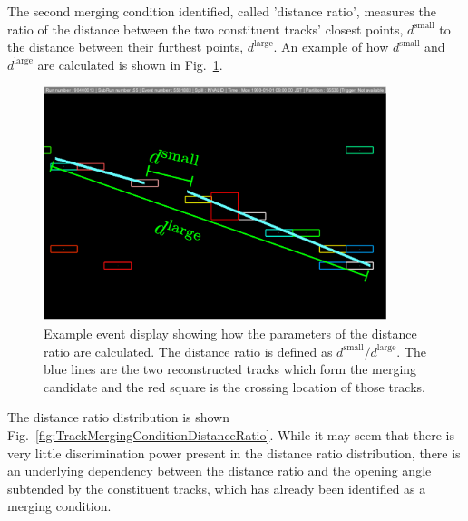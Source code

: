 \newline
\newline
The second merging condition identified, called 'distance ratio', measures the ratio of the distance between the two constituent tracks' closest points, $d^{\textrm{small}}$ to the distance between their furthest points, $d^{\textrm{large}}$.  An example of how $d^{\textrm{small}}$ and $d^{\textrm{large}}$ are calculated is shown in Fig.~\ref{fig:DistanceRatioEventDisplay}.    
\begin{figure}[!b]
  \centering
  \includegraphics[width=10cm]{images/selection/vertex_recon/distance_ratio_event_display}
  \caption{Example event display showing how the parameters of the distance ratio are calculated.  The distance ratio is defined as $d^{\textrm{small}}/d^{\textrm{large}}$.  The blue lines are the two reconstructed tracks which form the merging candidate and the red square is the crossing location of those tracks.}
  \label{fig:DistanceRatioEventDisplay}
\end{figure}
The distance ratio distribution is shown Fig.~\ref{fig:TrackMergingConditionDistanceRatio}.  While it may seem that there is very little discrimination power present in the distance ratio distribution, there is an underlying dependency between the distance ratio and the opening angle subtended by the constituent tracks, which has already been identified as a merging condition.
